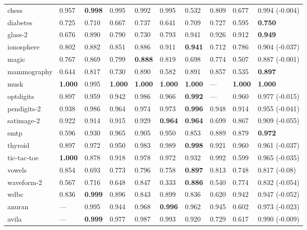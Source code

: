 \begin{table}[ht]
\begin{tabular}{l|llllllll|l}
  chess & 0.957 & \textbf{0.998} & 0.995 & 0.992 & 0.995 & 0.532 & 0.809 & 0.677 & 0.994 \tiny{(-0.004)} \\ 
  diabetes & 0.725 & 0.710 & 0.667 & 0.737 & 0.641 & 0.709 & 0.727 & 0.595 & \textbf{0.750} \\ 
  glass-2 & 0.676 & 0.890 & 0.790 & 0.730 & 0.793 & 0.941 & 0.926 & 0.912 & \textbf{0.949} \\ 
  ionosphere & 0.802 & 0.882 & 0.851 & 0.886 & 0.911 & \textbf{0.941} & 0.712 & 0.786 & 0.904 \tiny{(-0.037)} \\ 
  magic & 0.767 & 0.869 & 0.799 & \textbf{0.888} & 0.819 & 0.698 & 0.774 & 0.507 & 0.887 \tiny{(-0.001)} \\ 
  mammography & 0.644 & 0.817 & 0.730 & 0.890 & 0.582 & 0.891 & 0.857 & 0.535 & \textbf{0.897} \\ 
  musk & \textbf{1.000} & 0.995 & \textbf{1.000} & \textbf{1.000} & \textbf{1.000} & \textbf{1.000} & --- & \textbf{1.000} & \textbf{1.000} \\ 
  optdigits & 0.897 & 0.959 & 0.942 & 0.986 & 0.966 & \textbf{0.992} & --- & 0.960 & 0.977 \tiny{(-0.015)} \\ 
  pendigits-2 & 0.938 & 0.986 & 0.964 & 0.974 & 0.973 & \textbf{0.996} & 0.948 & 0.914 & 0.955 \tiny{(-0.041)} \\ 
  satimage-2 & 0.922 & 0.914 & 0.915 & 0.929 & \textbf{0.964} & \textbf{0.964} & 0.699 & 0.867 & 0.909 \tiny{(-0.055)} \\ 
  smtp & 0.596 & 0.930 & 0.965 & 0.905 & 0.950 & 0.853 & 0.889 & 0.879 & \textbf{0.972} \\ 
  thyroid & 0.897 & 0.972 & 0.950 & 0.983 & 0.989 & \textbf{0.998} & 0.921 & 0.960 & 0.961 \tiny{(-0.037)} \\ 
  tic-tac-toe & \textbf{1.000} & 0.878 & 0.918 & 0.978 & 0.972 & 0.932 & 0.992 & 0.599 & 0.965 \tiny{(-0.035)} \\ 
  vowels & 0.854 & 0.693 & 0.773 & 0.796 & 0.758 & \textbf{0.897} & 0.813 & 0.748 & 0.817 \tiny{(-0.08)} \\ 
  waveform-2 & 0.567 & 0.716 & 0.648 & 0.847 & 0.333 & \textbf{0.886} & 0.540 & 0.774 & 0.832 \tiny{(-0.054)} \\ 
  wdbc & 0.836 & \textbf{0.999} & 0.896 & 0.843 & 0.899 & 0.836 & 0.620 & 0.942 & 0.947 \tiny{(-0.052)} \\ 
  \hline
  anuran & --- & 0.995 & 0.944 & 0.968 & \textbf{0.996} & 0.962 & 0.945 & 0.602 & 0.973 \tiny{(-0.023)} \\ 
  avila & --- & \textbf{0.999} & 0.977 & 0.987 & 0.993 & 0.920 & 0.729 & 0.617 & 0.990 \tiny{(-0.009)} \\ 

\end{tabular}
\end{table}
